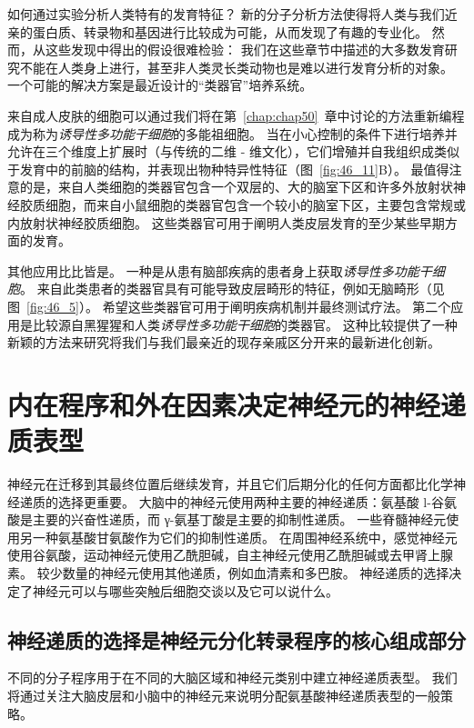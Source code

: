 如何通过实验分析人类特有的发育特征？
新的分子分析方法使得将人类与我们近亲的蛋白质、转录物和基因进行比较成为可能，从而发现了有趣的专业化。
然而，从这些发现中得出的假设很难检验：
我们在这些章节中描述的大多数发育研究不能在人类身上进行，甚至非人类灵长类动物也是难以进行发育分析的对象。
一个可能的解决方案是最近设计的“类器官”培养系统。


来自成人皮肤的细胞可以通过我们将在第~\ref{chap:chap50}~章中讨论的方法重新编程成为称为\textit{诱导性多功能干细胞}的多能祖细胞。
当在小心控制的条件下进行培养并允许在三个维度上扩展时（与传统的二维 - 维文化），它们增殖并自我组织成类似于发育中的前脑的结构，并表现出物种特异性特征（图~\ref{fig:46_11}B）。
最值得注意的是，来自人类细胞的类器官包含一个双层的、大的脑室下区和许多外放射状神经胶质细胞，而来自小鼠细胞的类器官包含一个较小的脑室下区，主要包含常规或内放射状神经胶质细胞。
这些类器官可用于阐明人类皮层发育的至少某些早期方面的发育。


其他应用比比皆是。
一种是从患有脑部疾病的患者身上获取\textit{诱导性多功能干细胞}。
来自此类患者的类器官具有可能导致皮层畸形的特征，例如无脑畸形（见图~\ref{fig:46_5}）。
希望这些类器官可用于阐明疾病机制并最终测试疗法。
第二个应用是比较源自黑猩猩和人类\textit{诱导性多功能干细胞}的类器官。
这种比较提供了一种新颖的方法来研究将我们与我们最亲近的现存亲戚区分开来的最新进化创新。



\section{内在程序和外在因素决定神经元的神经递质表型}

神经元在迁移到其最终位置后继续发育，并且它们后期分化的任何方面都比化学神经递质的选择更重要。
大脑中的神经元使用两种主要的神经递质：氨基酸 l-谷氨酸是主要的兴奋性递质，而 γ-氨基丁酸是主要的抑制性递质。
一些脊髓神经元使用另一种氨基酸甘氨酸作为它们的抑制性递质。
在周围神经系统中，感觉神经元使用谷氨酸，运动神经元使用乙酰胆碱，自主神经元使用乙酰胆碱或去甲肾上腺素。
较少数量的神经元使用其他递质，例如血清素和多巴胺。
神经递质的选择决定了神经元可以与哪些突触后细胞交谈以及它可以说什么。



\subsection{神经递质的选择是神经元分化转录程序的核心组成部分}

不同的分子程序用于在不同的大脑区域和神经元类别中建立神经递质表型。
我们将通过关注大脑皮层和小脑中的神经元来说明分配氨基酸神经递质表型的一般策略。


